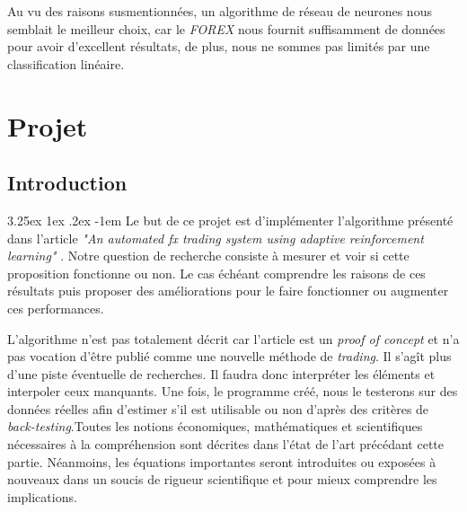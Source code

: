 \documentclass[a4paper, 11pt]{article}
\makeatletter
\renewcommand\paragraph{\@startsection{paragraph}{5}{\z@}%
  {3.25ex \@plus1ex \@minus.2ex}%
  {-1em}%
  {\normalfont\normalsize\bfseries}}
\makeatother
\begin{document}
Au vu des raisons susmentionnées, un algorithme de réseau de neurones nous semblait le meilleur choix, car le \textit{FOREX} nous
fournit suffisamment de données pour avoir d'excellent résultats, de plus, nous ne sommes pas limités par une classification linéaire.


\newpage
\section{Projet}
\subsection{Introduction}
\paragraph{}
Le but de ce projet est d'implémenter l'algorithme présenté dans l'article \textit{"An automated fx trading system using adaptive
reinforcement learning"} \cite{fx_trading}. Notre question de recherche consiste à mesurer et voir si cette proposition fonctionne ou non. Le cas
échéant comprendre les raisons de ces résultats puis proposer des améliorations pour le faire fonctionner ou augmenter ces performances.

L'algorithme n'est pas totalement décrit car l'article
est un \textit{proof of concept} et n'a pas vocation d'être publié comme une nouvelle méthode de \textit{trading}. Il s'agît plus d'une piste 
éventuelle de recherches. Il faudra donc
interpréter les éléments et interpoler ceux manquants. Une fois, le programme créé, nous le testerons sur des données réelles afin d'estimer s'il est
utilisable ou non d'après des critères de \textit{back-testing}.Toutes les notions économiques, mathématiques et scientifiques nécessaires à la 
compréhension sont décrites dans l'état de l'art précédant cette partie. Néanmoins, les équations importantes seront introduites ou exposées à nouveaux
dans un soucis de rigueur scientifique et pour mieux comprendre les implications.
\end{document}
